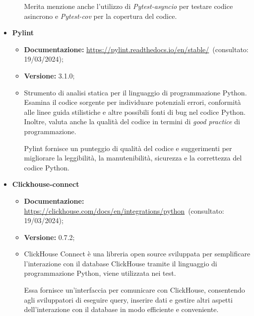 \begin{itemize}
\begin{itemize}
        Merita menzione anche l'utilizzo di \textit{Pytest-asyncio} per testare codice asincrono e \textit{Pytest-cov} per la copertura del codice.
    \end{itemize}
    
    \item \textbf{Pylint}
    \begin{itemize}
        \item \textbf{Documentazione:} \url{https://pylint.readthedocs.io/en/stable/}~(consultato: 19/03/2024);
        \item \textbf{Versione:} 3.1.0;
        \item Strumento di analisi statica per il linguaggio di programmazione Python. Esamina il codice sorgente per individuare potenziali errori, conformità alle linee guida stilistiche e altre possibili fonti di bug nel codice Python. Inoltre, valuta anche la qualità del codice in termini di \textit{good practice} di programmazione.
        
        Pylint fornisce un punteggio di qualità del codice e suggerimenti per migliorare la leggibilità, la manutenibilità, sicurezza e la correttezza del codice Python.
    \end{itemize}
    
    \item \textbf{Clickhouse-connect}
    \begin{itemize}
        \item \textbf{Documentazione:} \url{https://clickhouse.com/docs/en/integrations/python}~(consultato: 19/03/2024);
        \item \textbf{Versione:} 0.7.2;
        \item ClickHouse Connect è una libreria open source sviluppata per semplificare l'interazione con il database ClickHouse tramite il linguaggio di programmazione Python, viene utilizzata nei test.
        
        Essa fornisce un'interfaccia per comunicare con ClickHouse, consentendo agli sviluppatori di eseguire query, inserire dati e gestire altri aspetti dell'interazione con il database in modo efficiente e conveniente.
    \end{itemize}
\end{itemize}
